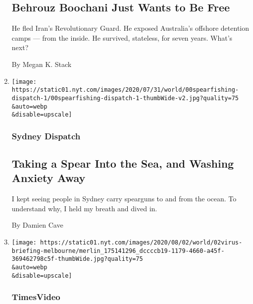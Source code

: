 \begin{enumerate}
  \hypertarget{behrouz-boochani-just-wants-to-be-free}{%
  \subsection{Behrouz Boochani Just Wants to Be
  Free}\label{behrouz-boochani-just-wants-to-be-free}}

  He fled Iran's Revolutionary Guard. He exposed Australia's offshore
  detention camps --- from the inside. He survived, stateless, for seven
  years. What's next?

  By Megan K. Stack
\item
  \href{/2020/08/03/world/australia/spearfishing-sydney-coronavirus.html}{}

  \texttt{[image: https://static01.nyt.com/images/2020/07/31/world/00spearfishing-dispatch-1/00spearfishing-dispatch-1-thumbWide-v2.jpg?quality=75\\\&auto=webp\\\&disable=upscale]}

  \hypertarget{sydney-dispatch}{%
  \subsubsection{Sydney Dispatch}\label{sydney-dispatch}}

  \hypertarget{taking-a-spear-into-the-sea-and-washing-anxiety-away}{%
  \subsection{Taking a Spear Into the Sea, and Washing Anxiety
  Away}\label{taking-a-spear-into-the-sea-and-washing-anxiety-away}}

  I kept seeing people in Sydney carry spearguns to and from the ocean.
  To understand why, I held my breath and dived in.

  By Damien Cave
\item
  \href{/video/world/australia/100000007269116/coronavirus-restrictions-melbourne.html}{}

  \texttt{[image: https://static01.nyt.com/images/2020/08/02/world/02virus-briefing-melbourne/merlin\_175141296\_dccccb19-1179-4660-a45f-369462798c5f-thumbWide.jpg?quality=75\\\&auto=webp\\\&disable=upscale]}

  \hypertarget{timesvideo}{%
  \subsubsection{TimesVideo}\label{timesvideo}}

  \hypertarget{melbourne-tightens-lockdown-as-virus-outbreak-spreads}{%
}
\end{enumerate}
